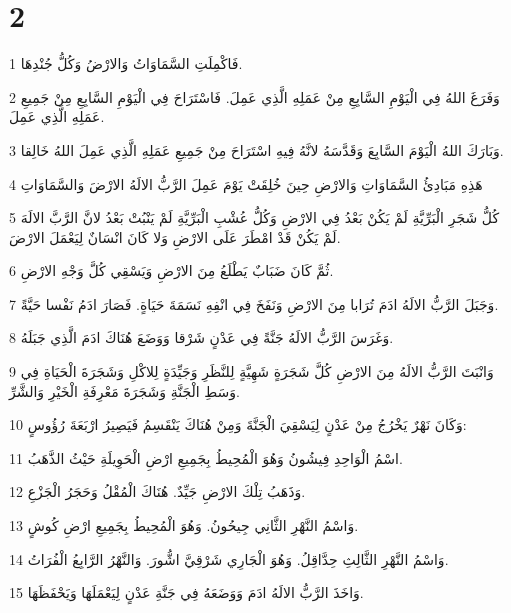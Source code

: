 \chapter{2}

\par 1 فَاكْمِلَتِ السَّمَاوَاتُ وَالارْضُ وَكُلُّ جُنْدِهَا.
\par 2 وَفَرَغَ اللهُ فِي الْيَوْمِ السَّابِعِ مِنْ عَمَلِهِ الَّذِي عَمِلَ. فَاسْتَرَاحَ فِي الْيَوْمِ السَّابِعِ مِنْ جَمِيعِ عَمَلِهِ الَّذِي عَمِلَ.
\par 3 وَبَارَكَ اللهُ الْيَوْمَ السَّابِعَ وَقَدَّسَهُ لانَّهُ فِيهِ اسْتَرَاحَ مِنْ جَمِيعِ عَمَلِهِ الَّذِي عَمِلَ اللهُ خَالِقا.
\par 4 هَذِهِ مَبَادِئُ السَّمَاوَاتِ وَالارْضِ حِينَ خُلِقَتْ يَوْمَ عَمِلَ الرَّبُّ الالَهُ الارْضَ وَالسَّمَاوَاتِ
\par 5 كُلُّ شَجَرِ الْبَرِّيَّةِ لَمْ يَكُنْ بَعْدُ فِي الارْضِ وَكُلُّ عُشْبِ الْبَرِّيَّةِ لَمْ يَنْبُتْ بَعْدُ لانَّ الرَّبَّ الالَهَ لَمْ يَكُنْ قَدْ امْطَرَ عَلَى الارْضِ وَلا كَانَ انْسَانٌ لِيَعْمَلَ الارْضَ.
\par 6 ثُمَّ كَانَ ضَبَابٌ يَطْلَعُ مِنَ الارْضِ وَيَسْقِي كُلَّ وَجْهِ الارْضِ.
\par 7 وَجَبَلَ الرَّبُّ الالَهُ ادَمَ تُرَابا مِنَ الارْضِ وَنَفَخَ فِي انْفِهِ نَسَمَةَ حَيَاةٍ. فَصَارَ ادَمُ نَفْسا حَيَّةً.
\par 8 وَغَرَسَ الرَّبُّ الالَهُ جَنَّةً فِي عَدْنٍ شَرْقا وَوَضَعَ هُنَاكَ ادَمَ الَّذِي جَبَلَهُ.
\par 9 وَانْبَتَ الرَّبُّ الالَهُ مِنَ الارْضِ كُلَّ شَجَرَةٍ شَهِيَّةٍ لِلنَّظَرِ وَجَيِّدَةٍ لِلاكْلِ وَشَجَرَةَ الْحَيَاةِ فِي وَسَطِ الْجَنَّةِ وَشَجَرَةَ مَعْرِفَةِ الْخَيْرِ وَالشَّرِّ.
\par 10 وَكَانَ نَهْرٌ يَخْرُجُ مِنْ عَدْنٍ لِيَسْقِيَ الْجَنَّةَ وَمِنْ هُنَاكَ يَنْقَسِمُ فَيَصِيرُ ارْبَعَةَ رُؤُوسٍ:
\par 11 اسْمُ الْوَاحِدِ فِيشُونُ وَهُوَ الْمُحِيطُ بِجَمِيعِ ارْضِ الْحَوِيلَةِ حَيْثُ الذَّهَبُ.
\par 12 وَذَهَبُ تِلْكَ الارْضِ جَيِّدٌ. هُنَاكَ الْمُقْلُ وَحَجَرُ الْجَزْعِ.
\par 13 وَاسْمُ النَّهْرِ الثَّانِي جِيحُونُ. وَهُوَ الْمُحِيطُ بِجَمِيعِ ارْضِ كُوشٍ.
\par 14 وَاسْمُ النَّهْرِ الثَّالِثِ حِدَّاقِلُ. وَهُوَ الْجَارِي شَرْقِيَّ اشُّورَ. وَالنَّهْرُ الرَّابِعُ الْفُرَاتُ.
\par 15 وَاخَذَ الرَّبُّ الالَهُ ادَمَ وَوَضَعَهُ فِي جَنَّةِ عَدْنٍ لِيَعْمَلَهَا وَيَحْفَظَهَا.
